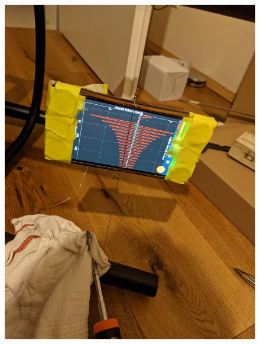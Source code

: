 \documentclass[11pt,ngerman]{scrartcl}
\begin{document}
\begin{figure}[H]
\begin{minipage}[htbp]{\linewidth}
\begin{minipage}[htbp]{.32\linewidth}
            \includegraphics[angle=-90,origin=c,width=\linewidth]{pics/Aufbau (2).jpg}
        \end{minipage}
        \begin{minipage}[htbp]{.32\linewidth} %

\end{minipage}
\end{minipage}
\end{figure}
\end{document}
